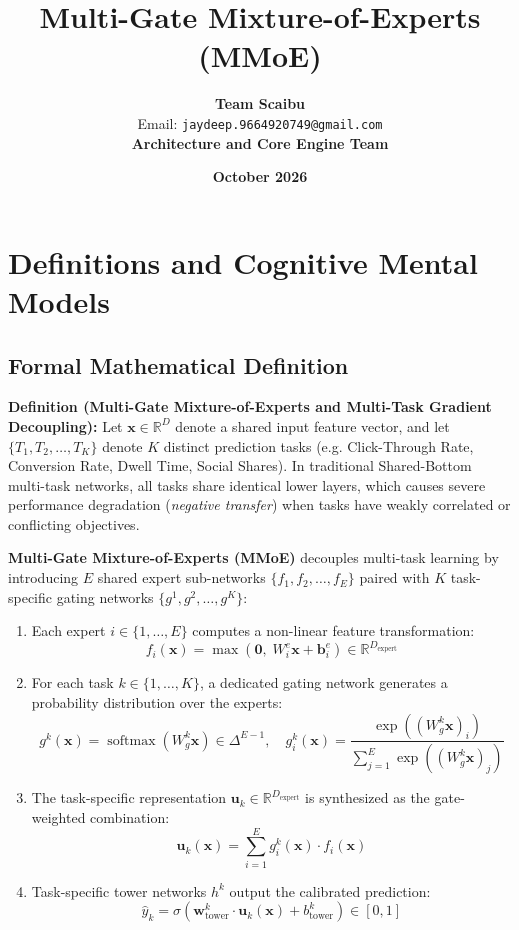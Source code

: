 \documentclass[11pt,a4paper]{article}
\title{\textbf{Multi-Gate Mixture-of-Experts (MMoE)}}
\author{\textbf{Team Scaibu} \\ \small Email: \texttt{jaydeep.9664920749@gmail.com} \\ \small \textbf{Architecture and Core Engine Team}}
\date{\textbf{October 2026}}
\theoremstyle{definition}
\begin{document}
\maketitle

\section{Definitions and Cognitive Mental Models}

\subsection{Formal Mathematical Definition}
\textbf{Definition (Multi-Gate Mixture-of-Experts and Multi-Task Gradient Decoupling):}
Let $\mathbf{x} \in \mathbb{R}^D$ denote a shared input feature vector, and let $\{T_1, T_2, \dots, T_K\}$ denote $K$ distinct prediction tasks (e.g. Click-Through Rate, Conversion Rate, Dwell Time, Social Shares). In traditional Shared-Bottom multi-task networks, all tasks share identical lower layers, which causes severe performance degradation (\emph{negative transfer}) when tasks have weakly correlated or conflicting objectives.

\textbf{Multi-Gate Mixture-of-Experts (MMoE)} decouples multi-task learning by introducing $E$ shared expert sub-networks $\{f_1, f_2, \dots, f_E\}$ paired with $K$ task-specific gating networks $\{g^1, g^2, \dots, g^K\}$:
\begin{enumerate}
    \item Each expert $i \in \{1, \dots, E\}$ computes a non-linear feature transformation:
    {\boldmath
    \begin{equation}
    f_i(\mathbf{x}) = \max\left( \mathbf{0}, \; W_i^e \mathbf{x} + \mathbf{b}_i^e \right) \in \mathbb{R}^{D_{\text{expert}}}
    \end{equation}
    }
    \item For each task $k \in \{1, \dots, K\}$, a dedicated gating network generates a probability distribution over the experts:
    {\boldmath
    \begin{equation}
    g^k(\mathbf{x}) = \operatorname{softmax}\left( W_g^k \mathbf{x} \right) \in \Delta^{E-1}, \quad g_i^k(\mathbf{x}) = \frac{\exp\left( (W_g^k \mathbf{x})_i \right)}{\sum_{j=1}^E \exp\left( (W_g^k \mathbf{x})_j \right)}
    \end{equation}
    }
    \item The task-specific representation $\mathbf{u}_k \in \mathbb{R}^{D_{\text{expert}}}$ is synthesized as the gate-weighted combination:
    {\boldmath
    \begin{equation}
    \mathbf{u}_k(\mathbf{x}) = \sum_{i=1}^E g_i^k(\mathbf{x}) \cdot f_i(\mathbf{x})
    \end{equation}
    }
    \item Task-specific tower networks $h^k$ output the calibrated prediction:
    {\boldmath
    \begin{equation}
    \widehat{y}_k = \sigma\left( \mathbf{w}_{\text{tower}}^k \cdot \mathbf{u}_k(\mathbf{x}) + b_{\text{tower}}^k \right) \in [0, 1]
    \end{equation}
    }
\end{enumerate}
\end{document}
